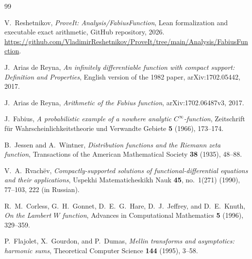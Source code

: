 \documentclass[11pt]{article}
\numberwithin{equation}{section}
\theoremstyle{definition}
\theoremstyle{remark}
\begin{document}
\begin{thebibliography}{99}

V.~Reshetnikov,
\emph{ProveIt: Analysis/FabiusFunction},
Lean formalization and executable exact arithmetic,
GitHub repository, 2026.
\url{https://github.com/VladimirReshetnikov/ProveIt/tree/main/Analysis/FabiusFunction}.

J.~Arias de Reyna,
\emph{An infinitely differentiable function with compact support: Definition
and Properties},
English version of the 1982 paper,
arXiv:1702.05442, 2017.

J.~Arias de Reyna,
\emph{Arithmetic of the Fabius function},
arXiv:1702.06487v3, 2017.

J.~Fabius,
\emph{A probabilistic example of a nowhere analytic $C^\infty$-function},
Zeitschrift f\"ur Wahrscheinlichkeitstheorie und Verwandte Gebiete
\textbf{5} (1966), 173--174.

B.~Jessen and A.~Wintner,
\emph{Distribution functions and the Riemann zeta function},
Transactions of the American Mathematical Society
\textbf{38} (1935), 48--88.

V.~A.~Rvach\"ev,
\emph{Compactly-supported solutions of functional-differential equations and
their applications},
Uspekhi Matematicheskikh Nauk \textbf{45}, no.~1(271) (1990), 77--103, 222
(in Russian).

R.~M.~Corless, G.~H.~Gonnet, D.~E.~G.~Hare, D.~J.~Jeffrey, and D.~E.~Knuth,
\emph{On the Lambert $W$ function},
Advances in Computational Mathematics \textbf{5} (1996), 329--359.

P.~Flajolet, X.~Gourdon, and P.~Dumas,
\emph{Mellin transforms and asymptotics: harmonic sums},
Theoretical Computer Science \textbf{144} (1995), 3--58.

\end{thebibliography}
\end{document}
